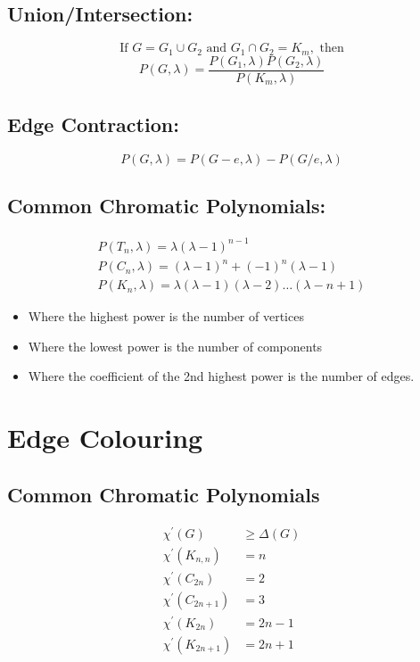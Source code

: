 \subsection{Union/Intersection:}
$$\text { If } G=G_{1} \cup G_{2} \text {  and  } G_{1} \cap G_{2}=K_{m}, \text {  then }$$
$$P(G, \lambda)=\frac{P\left(G_{1}, \lambda\right) P\left(G_{2}, \lambda\right)}{P\left(K_{m}, \lambda\right)}$$
%
\subsection{Edge Contraction:}
$$ P(G, \lambda)=P(G-e, \lambda)-P(G/e, \lambda)$$
%
\subsection{Common Chromatic Polynomials:}
$$
\begin{array}{l}
P\left(T_{n}, \lambda\right)=\lambda(\lambda-1)^{n-1} \\
P\left(C_{n}, \lambda\right)=(\lambda-1)^{n}+(-1)^{n}(\lambda-1) \\
P\left(K_{n}, \lambda\right)=\lambda(\lambda-1)(\lambda-2) \ldots(\lambda-n+1)
\end{array}
$$
%
\begin{center}
 \begin{minipage}{0.75\textwidth}
 \begin{itemize}
 \setlength\itemsep{0em}
\item Where the highest power is the number of vertices
\item Where the lowest power is the number of components
\item Where the coefficient of the 2nd highest power is the number of edges.
\end{itemize}
\end{minipage}
\end{center}
%
\section{Edge Colouring}
%
\subsection{Common Chromatic Polynomials}
$$
\begin{array}{ll}
\chi^{\prime}(G) &\geq \Delta(G) \\
\chi^{\prime}\left(K_{n, n}\right)&=n \\
\chi^{\prime}\left(C_{2 n}\right)&=2 \\
\chi^{\prime}\left(C_{2 n+1}\right)&=3 \\
\chi^{\prime}\left(K_{2 n}\right)&=2 n-1 \\
\chi^{\prime}\left(K_{2 n+1}\right)&=2 n+1
\end{array}
$$

